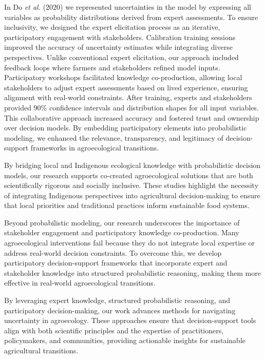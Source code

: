 \documentclass[
]{article}
\begin{document}
In Do \emph{et al.} (2020) we represented uncertainties in the model by
expressing all variables as probability distributions derived from
expert assessments. To ensure inclusivity, we designed the expert
elicitation process as an iterative, participatory engagement with
stakeholders. Calibration training sessions improved the accuracy of
uncertainty estimates while integrating diverse perspectives. Unlike
conventional expert elicitation, our approach included feedback loops
where farmers and stakeholders refined model inputs. Participatory
workshops facilitated knowledge co-production, allowing local
stakeholders to adjust expert assessments based on lived experience,
ensuring alignment with real-world constraints. After training, experts
and stakeholders provided 90\% confidence intervals and distribution
shapes for all input variables. This collaborative approach increased
accuracy and fostered trust and ownership over decision models. By
embedding participatory elements into probabilistic modeling, we
enhanced the relevance, transparency, and legitimacy of decision-support
frameworks in agroecological transitions.

By bridging local and Indigenous ecological knowledge with probabilistic
decision models, our research supports co-created agroecological
solutions that are both scientifically rigorous and socially inclusive.
These studies highlight the necessity of integrating Indigenous
perspectives into agricultural decision-making to ensure that local
priorities and traditional practices inform sustainable food systems.

Beyond probabilistic modeling, our research underscores the importance
of stakeholder engagement and participatory knowledge co-production.
Many agroecological interventions fail because they do not integrate
local expertise or address real-world decision constraints. To overcome
this, we develop participatory decision-support frameworks that
incorporate expert and stakeholder knowledge into structured
probabilistic reasoning, making them more effective in real-world
agroecological transitions.

By leveraging expert knowledge, structured probabilistic reasoning, and
participatory decision-making, our work advances methods for navigating
uncertainty in agroecology. These approaches ensure that
decision-support tools align with both scientific principles and the
expertise of practitioners, policymakers, and communities, providing
actionable insights for sustainable agricultural transitions.
\end{document}
